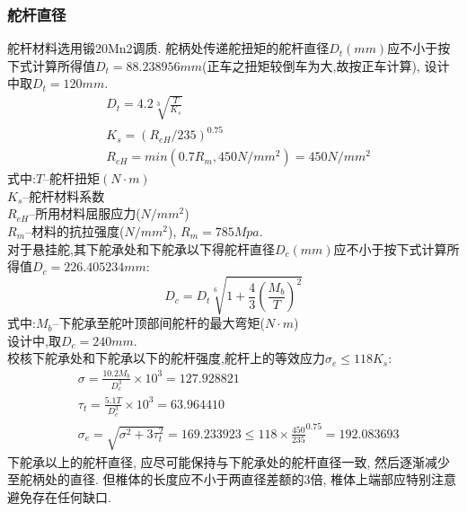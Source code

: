 \documentclass[a4paper,UTF8]{article}
\begin{document}
\subsubsection{舵杆直径}
舵杆材料选用锻20Mn2调质. 舵柄处传递舵扭矩的舵杆直径$D_{t}(mm)$应不小于按下式计算所得值$D_{t}=88.238956mm$(正车之扭矩较倒车为大,故按正车计算), 设计中取$D_{t}=120mm$.
\begin{equation}\label{equ:dt}
\begin{split}
&	D_{t}=4.2\sqrt[3]{\frac{T}{K_{s}}}\\
&	K_{s}=(R_{eH}/235)^{0.75}\\
&	R_{eH}=min(0.7R_{m},450N/mm^2)=450N/mm^2
\end{split}
\end{equation}
式中:$T$--舵杆扭矩$(N\cdot m)$\\
	$K_{s}$--舵杆材料系数\\
	$R_{eH}$--所用材料屈服应力($N/mm^2$)\\
	$R_{m}$--材料的抗拉强度($N/mm^2$), $R_{m}=785Mpa$.\\

对于悬挂舵,其下舵承处和下舵承以下得舵杆直径$D_{c}(mm)$应不小于按下式计算所得值$D_{c}=226.405234mm$:
\begin{equation}
	D_{c}=D_{t}\sqrt[6]{1+\frac{4}{3}(\frac{M_{b}}{T})^2}
\end{equation}
式中:$M_{b}$--下舵承至舵叶顶部间舵杆的最大弯矩($N\cdot m$)\\
设计中,取$D_{c}=240mm$.\\
校核下舵承处和下舵承以下的舵杆强度,舵杆上的等效应力$\sigma_{e}\leq118K_{s}$:
\begin{equation}
	\begin{split}
	&\sigma=\frac{10.2M_{b}}{D_{c}^3}\times 10^3=127.928821\\
	&\tau_{t}=\frac{5.1T}{D_{c}^3}\times 10^3=63.964410\\
	&\sigma_{e}=\sqrt{\sigma^2+3\tau_{t}^2}=169.233923\leq 118\times \frac{450}{235}^{0.75}=192.083693
	\end{split}
\end{equation}
下舵承以上的舵杆直径, 应尽可能保持与下舵承处的舵杆直径一致, 然后逐渐减少至舵柄处的直径. 但椎体的长度应不小于两直径差额的3倍, 椎体上端部应特别注意避免存在任何缺口.
\end{document}

